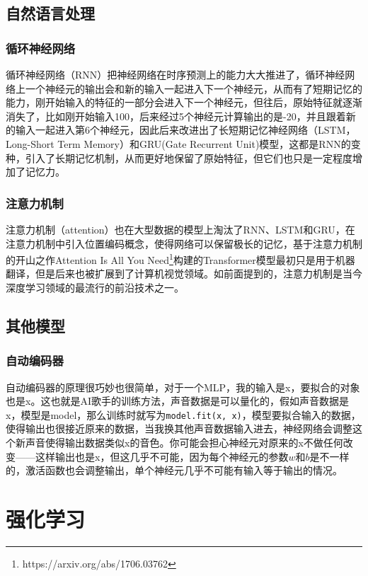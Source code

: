 \documentclass[a5paper, 11pt, openany]{book}
\begin{document}
\subsection{自然语言处理}

\subsubsection{循环神经网络}
循环神经网络（RNN）把神经网络在时序预测上的能力大大推进了，循环神经网络上一个神经元的输出会和新的输入一起进入下一个神经元，从而有了短期记忆的能力，刚开始输入的特征的一部分会进入下一个神经元，但往后，原始特征就逐渐消失了，比如刚开始输入100，后来经过5个神经元计算输出的是-20，并且跟着新的输入一起进入第6个神经元，因此后来改进出了长短期记忆神经网络（LSTM，Long-Short Term Memory）和GRU(Gate Recurrent Unit)模型，这都是RNN的变种，引入了长期记忆机制，从而更好地保留了原始特征，但它们也只是一定程度增加了记忆力。

\subsubsection{注意力机制}
注意力机制（attention）也在大型数据的模型上淘汰了RNN、LSTM和GRU，在注意力机制中引入位置编码概念，使得网络可以保留极长的记忆，基于注意力机制的开山之作Attention Is All You Need\footnote{https://arxiv.org/abs/1706.03762}构建的Transformer模型最初只是用于机器翻译，但是后来也被扩展到了计算机视觉领域。如前面提到的，注意力机制是当今深度学习领域的最流行的前沿技术之一。

\subsection{其他模型}
\subsubsection{自动编码器}
自动编码器的原理很巧妙也很简单，对于一个MLP，我的输入是x，要拟合的对象也是x。这也就是AI歌手的训练方法，声音数据是可以量化的，假如声音数据是x，模型是model，那么训练时就写为\verb|model.fit(x, x)|，模型要拟合输入的数据，使得输出也很接近原来的数据，当我换其他声音数据输入进去，神经网络会调整这个新声音使得输出数据类似x的音色。你可能会担心神经元对原来的x不做任何改变——这样输出也是x，但这几乎不可能，因为每个神经元的参数$w$和$b$是不一样的，激活函数也会调整输出，单个神经元几乎不可能有输入等于输出的情况。

\section{强化学习}
\end{document}
